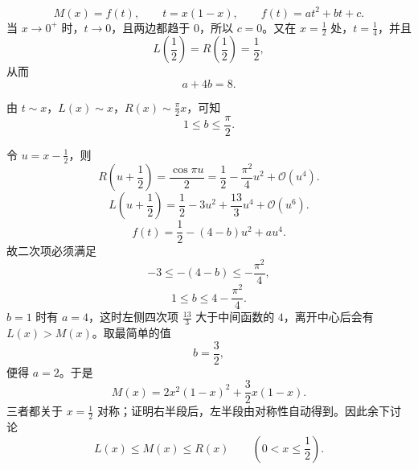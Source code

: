 \begin{solution}
\[
M(x)=f(t),\qquad t=x(1-x),\qquad f(t)=at^2+bt+c.
\]
当 $x\to0^+$ 时，$t\to0$，且两边都趋于 $0$，所以 $c=0$。又在 $x=\frac12$ 处，$t=\frac14$，并且
\[
L\left(\frac12\right)=R\left(\frac12\right)=\frac12,
\]
从而
\[
a + 4b = 8.
\]

由 $t\sim x$，$L(x)\sim x$，$R(x)\sim \frac{\pi}{2}x$，可知
\[
1 \le b \le \frac{\pi}{2}.
\]

令 $u=x-\frac12$，则
\[
R\left(u+\frac{1}{2}\right) = \frac{\cos \pi u}{2} = \frac{1}{2} - \frac{\pi^2}{4}u^2 + \mathcal{O}(u^4).
\]
\[
L\left(u+\frac{1}{2}\right) = \frac{1}{2} - 3u^2 + \frac{13}{3}u^4 + \mathcal{O}(u^6).
\]
\[
f(t) = \frac{1}{2} - (4-b)u^2 + au^4.
\]
故二次项必须满足
\[
-3 \le -(4-b) \le -\frac{\pi^2}{4},
\]
\[
1 \le b \le 4 - \frac{\pi^2}{4}.
\]
\(b=1\) 时有 \(a=4\)，这时左侧四次项 \(\frac{13}{3}\) 大于中间函数的 \(4\)，离开中心后会有 \(L(x)>M(x)\)。取最简单的值
\[
b = \frac{3}{2},
\]
便得 $a = 2$。于是
\[
M(x) = 2x^2(1-x)^2 + \frac{3}{2}x(1-x).
\]
三者都关于 $x=\frac12$ 对称；证明右半段后，左半段由对称性自动得到。因此余下讨论
\[
L(x)\le M(x)\le R(x)\qquad \left(0<x\le \frac12\right).
\]


\end{solution}
